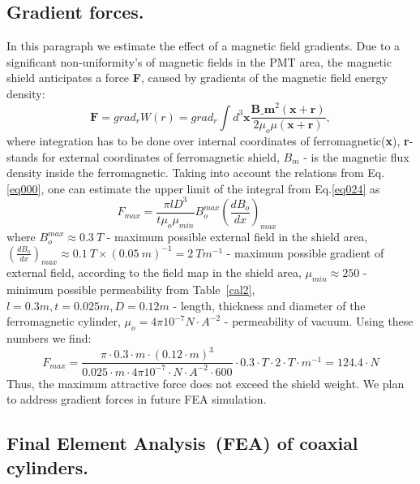 \documentclass[12pt]{article}
\begin{document}
\subsection{Gradient forces.}
In this paragraph we estimate the effect of a magnetic field gradients.
Due to a significant non-uniformity's  of magnetic fields in the PMT area,
the magnetic shield anticipates a  force \textbf{F}, caused
by  gradients of the magnetic field energy density:
\begin{equation}
\textbf{F}=grad_rW(r) = grad_r \int d^3 \textbf{x}
\frac
{ \textbf{B_m}^2({\textbf{x}+\textbf{r}})  }
{ 2\mu_{o}\mu( {\textbf{x}+\textbf{r}}  )  },
\label{eq024}
\end{equation}
where  integration has to be  done over  internal coordinates of
ferromagnetic(\textbf{x}), \textbf{r}- stands for external coordinates
of ferromagnetic shield, $B_m$ - is the magnetic flux density inside the
ferromagnetic.
%
Taking into account the  relations from Eq.\ref{eq000},
one can estimate the upper limit of  the integral from Eq.\ref{eq024} as 
%
\begin{equation}
{F_{max}= \frac{\pi l D^3}{t\mu_{o}\mu_{min}}
B_{o}^{max} ( \frac {dB_o} {dx})_{max}}~~~~~~~~~~~
\label{eq034}
\end{equation}
where 
$B_o^{max}\approx0.3~T$ - maximum  possible external field  in the shield area,
$(\frac{dB_o}{dx})_{max}\approx0.1~T\times(0.05~m)^{-1}=2~Tm^{-1}$ -   maximum 
possible gradient of external field, according to the  field map in the shield  area,
$\mu_{min}\approx250$ -   minimum possible permeability
from Table~\ref{cal2},
 $l=0.3m, t=0.025m, D=0.12m$ - length,  thickness
and diameter of the ferromagnetic cylinder,
$\mu_o = 4\pi 10^{-7}N·A^{-2}$  -  permeability of vacuum.
Using these numbers  we find:
%
\begin{equation}
F_{max}= \frac{\pi \cdot 0.3 \cdot m
\cdot (0.12 \cdot m)^3 }{0.025\cdot m \cdot
4 \pi 10^{-7}\cdot N \cdot A^{-2} \cdot 600} \cdot
0.3 \cdot T \cdot 2 \cdot T\cdot m^{-1}= 124.4 \cdot N
\label{eq035}
\end{equation}
Thus,  the maximum attractive   force
does not exceed the  shield  weight.
We plan  to  address  gradient forces in future   FEA simulation.




\subsection{Final Element Analysis~(FEA) of coaxial cylinders.}
\label{FEA}
\end{document}
